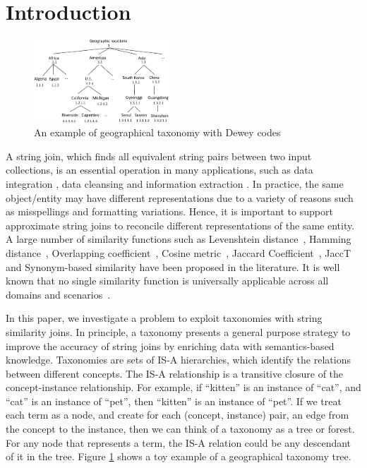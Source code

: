 \section{Introduction}

\begin{figure}[t]
\centering
\includegraphics[width=0.45\textwidth]{figures/taxonomylabels}
 \caption{An example of geographical taxonomy with Dewey codes}
\label{fig:toytaxonomyexample}
\end{figure}


A string join, which finds all equivalent string pairs between two input collections, is an essential operation in many applications, such as  data integration \cite{conf/sigmod/Sarawagi04}, data cleansing \cite{conf/vldb/ArasuGK06,journals/www/LiJM06} and information extraction \cite{books/Winkler99}. In practice, the same object/entity may have different representations  due to a variety of reasons such as misspellings and  formatting variations. Hence, it is important to support approximate string joins to reconcile different
representations of the same entity. A large number of  similarity functions such as Levenshtein distance~\cite{conf/sigmod/WangLF12},
Hamming distance~\cite{conf/spire/Kondrak05}, Overlapping coefficient~\cite{conf/icde/ChaudhuriGK06}, Cosine
metric~\cite{journals/ipm/SaltonB88}, Jaccard
Coefficient~\cite{conf/icde/ChaudhuriGK06,conf/icde/LiLL08}, JaccT \cite{conf/icde/ArasuCK08} and Synonym-based similarity \cite{conf/sigmod/LuLWLW13} have been proposed in the literature. It is well known
that no single similarity function is universally applicable
across all domains and scenarios~\cite{conf/ijcai/CohenRF03}.

In this paper, we investigate a problem to exploit taxonomies with string similarity joins. In principle, a taxonomy presents a general purpose strategy to improve the accuracy of string joins by enriching data with semantics-based knowledge. Taxonomies are sets of IS-A hierarchies, which identify the relations between different concepts. The IS-A relationship
is a transitive closure of the concept-instance relationship.
For example, if ``\textsf{kitten}'' is an instance of ``\textsf{cat}'', and
``\textsf{cat}'' is an instance of ``\textsf{pet}'', then ``\textsf{kitten}'' is an instance
of ``\textsf{pet}''. If we treat each term as a node, and create
for each (\textsf{concept}, \textsf{instance}) pair, an edge from the concept
to the instance, then we can think of a taxonomy as a tree or forest. For any node that represents a term,
the IS-A relation could be any descendant of it in the tree. Figure
\ref{fig:toytaxonomyexample} shows a toy example of a geographical taxonomy tree.

